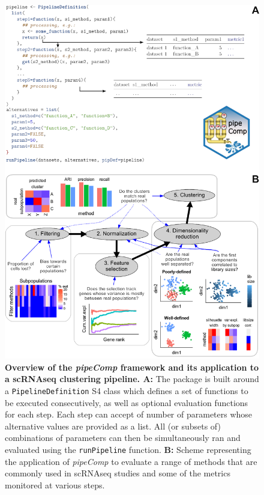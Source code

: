 \documentclass[11pt]{article}
\begin{document}
\begin{figure}
    \centering
    \includegraphics[width=\textwidth,keepaspectratio]{main_figures/pipeline_explanation.png}
    \caption{\textbf{Overview of the \textit{pipeComp} framework and its application to a scRNAseq clustering pipeline. A:} The package is built around a \texttt{PipelineDefinition} S4 class which defines a set of functions to be executed consecutively, as well as optional evaluation functions for each step. Each step can accept of number of parameters whose alternative values are provided as a list. All (or subsets of) combinations of parameters can then be simultaneously ran and evaluated using the \texttt{runPipeline} function. \textbf{B:} Scheme representing the application of \textit{pipeComp} to evaluate a range of methods that are commonly used in scRNAseq studies and some of the metrics monitored at various steps.}
    \label{fig:figure2}
\end{figure}
\end{document}
